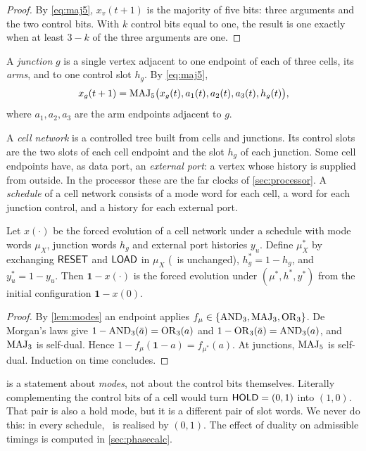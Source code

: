 \begin{proof}
By \eqref{eq:maj5}, $x_v(t+1)$ is the majority of five bits: three arguments and the two control
bits. With $k$ control bits equal to one, the result is one exactly when at least $3-k$ of the three
arguments are one.
\end{proof}

\begin{definition}[Junction]\label{def:junction}
A \emph{junction} $g$ is a single vertex adjacent to one endpoint of each of three cells, its
\emph{arms}, and to one control slot $h_g$. By \eqref{eq:maj5},
\[
x_g(t+1)=\operatorname{MAJ}_5\bigl(x_g(t),a_1(t),a_2(t),a_3(t),h_g(t)\bigr),
\]
where $a_1,a_2,a_3$ are the arm
endpoints adjacent to $g$.
\end{definition}

A \emph{cell network} is a controlled tree built from cells and junctions. Its control slots are
the two slots of each cell endpoint and the slot $h_g$ of each junction. Some cell endpoints have,
as data port, an \emph{external port}: a vertex whose history is supplied from outside. In the
processor these are the far clocks of \cref{sec:processor}. A \emph{schedule} of a cell network
consists of a mode word for each cell, a word for each junction control, and a history for each
external port.

\begin{lemma}\label{lem:duality}
Let $x(\cdot)$ be the forced evolution of a cell network under a schedule with mode words $\mu_X$,
junction words $h_g$ and external port histories $y_u$. Define $\mu^\ast_X$ by exchanging $\textsf{RESET}$
and $\textsf{LOAD}$ in $\mu_X$ (\HOLD\ is unchanged), $h^\ast_g=1-h_g$, and $y^\ast_u=1-y_u$. Then
$\mathbf 1-x(\cdot)$ is the forced evolution under $(\mu^\ast,h^\ast,y^\ast)$ from the initial
configuration $\mathbf 1-x(0)$.
\end{lemma}

\begin{proof}
By \cref{lem:modes} an endpoint applies $f_\mu\in\{\operatorname{AND}_3,\operatorname{MAJ}_3,\operatorname{OR}_3\}$. De Morgan's laws give
$1-\operatorname{AND}_3(\bar a)=\operatorname{OR}_3(a)$ and $1-\operatorname{OR}_3(\bar a)=\operatorname{AND}_3(a)$, and $\operatorname{MAJ}_3$ is self-dual. Hence
$1-f_\mu(\mathbf 1-a)=f_{\mu^\ast}(a)$. At junctions, $\operatorname{MAJ}_5$ is self-dual. Induction on time
concludes.
\end{proof}

\begin{remark}\label{rem:dualcontrols}
 is a statement about \emph{modes}, not about the control bits themselves.
Literally complementing the control bits of a cell would turn $\textsf{HOLD}=(0,1)$ into $(1,0)$. That pair
is also a hold mode, but it is a different pair of slot words. We never do this: in every schedule,
\HOLD\ is realised by $(0,1)$. The effect of duality on admissible timings is computed in
\cref{sec:phasecalc}.
\end{remark}

